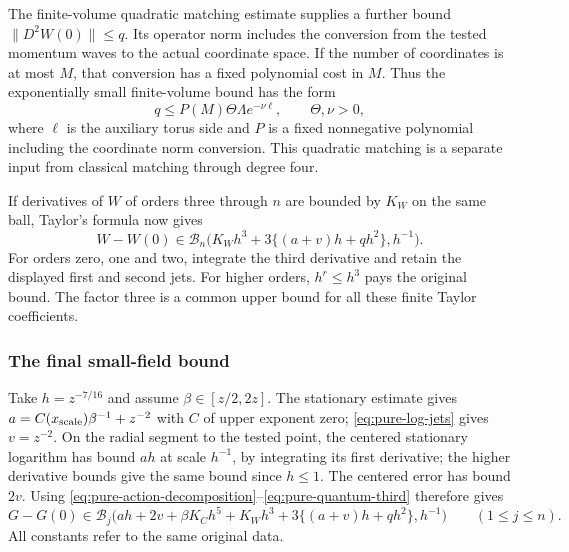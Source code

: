 The finite-volume quadratic matching estimate supplies a further
bound $\|D^2W(0)\|\le q$. Its operator norm includes the conversion
from the tested momentum waves to the actual coordinate space.
If the number of coordinates is at most $M$, that conversion has
a fixed polynomial cost in $M$. Thus the exponentially small
finite-volume bound has the form
\[
                 q\le P(M)\Theta\Lambda e^{-\nu\ell},
                       \qquad \Theta,\nu>0,
\]
where $\ell$ is the auxiliary torus side and $P$ is a fixed
nonnegative polynomial including the coordinate norm conversion.
This quadratic matching is a separate input from classical
matching through degree four.

If derivatives of $W$ of orders three through $n$ are bounded by
$K_W$ on the same ball, Taylor's formula now gives
\begin{equation}\label{eq:pure-quantum-third}
 W-W(0)\in\mathcal B_n
       \bigl(K_Wh^3+3\{(a+v)h+qh^2\},h^{-1}\bigr).
\end{equation}
For orders zero, one and two, integrate the third derivative and
retain the displayed first and second jets. For higher orders,
$h^r\le h^3$ pays the original bound. The factor three is a
common upper bound for all these finite Taylor coefficients.

\subsubsection{The final small-field bound}
Take $h=z^{-7/16}$ and assume $\beta\in[z/2,2z]$.
The stationary estimate gives
$a=C(x_{\rm scale})\beta^{-1}+z^{-2}$ with $C$ of upper exponent
zero; \eqref{eq:pure-log-jets} gives $v=z^{-2}$. On the radial
segment to the tested point, the centered stationary logarithm has
bound $ah$ at scale $h^{-1}$, by integrating its first derivative;
the higher derivative bounds give the same bound since $h\le1$.
The centered error has bound $2v$.
Using \eqref{eq:pure-action-decomposition}--\eqref{eq:pure-quantum-third}
therefore gives
\begin{equation}\label{eq:pure-remainder-budget}
 G-G(0)\in\mathcal B_j
 \bigl(ah+2v+\beta K_Ch^5
                +K_Wh^3+3\{(a+v)h+qh^2\},h^{-1}\bigr)
                       \qquad(1\le j\le n).
\end{equation}
All constants refer to the same original data.


